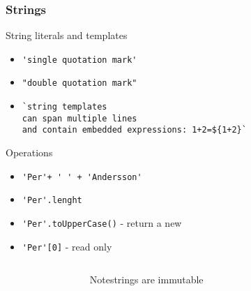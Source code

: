 \begin{frame}[fragile]
  \frametitle{Strings}
String literals and templates
\begin{itemize}
  \item \verb|'single quotation mark'|
  \item \verb|"double quotation mark"|
  \item \verb|`string templates| \\
           \verb|can span multiple lines| \\
           \verb|and contain embedded expressions: 1+2=${1+2}`|
\end{itemize}
Operations
\begin{itemize}
  \item \verb|'Per'+ ' ' + 'Andersson'|
  \item \verb|'Per'.lenght|
  \item \verb|'Per'.toUpperCase()| -  return a new 
  \item \verb|'Per'[0]| - read only
\end{itemize}
\begin{columns}[onlytextwidth]
  \begin{column}{0.3\textwidth}  \end{column}
  \begin{column}{0.4\textwidth}
    \begin{alertblock}{Note}strings are immutable \end{alertblock}
  \end{column}
  \begin{column}{0.3\textwidth}  \end{column}
\end{columns}%
 \end{frame}
